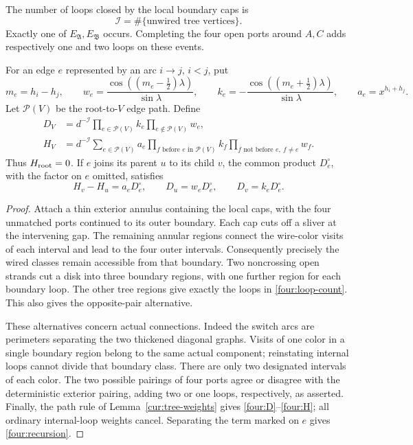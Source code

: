 \begin{lemma}
\label{four:tree}
The number of loops closed by the local boundary caps is
\begin{equation}
 \mathcal I=\#\{\text{unwired tree vertices}\}.
 \label{four:loop-count}
\end{equation}
Exactly one of $E_{\mathfrak A},E_{\mathfrak B}$ occurs.  Completing the
four open ports around $A,C$ adds respectively one and two loops on these
events.

For an edge $e$ represented by an arc $i\to j$, $i<j$, put
\begin{equation}
 m_e=h_i-h_j,\qquad
 w_e=\frac{\cos((m_e-\tfrac12)\lambda)}{\sin\lambda},\qquad
 k_e=-\frac{\cos((m_e+\tfrac12)\lambda)}{\sin\lambda},\qquad
 a_e=x^{h_i+h_j}.
 \label{four:edge-weights}
\end{equation}
Let $\mathcal P(V)$ be the root-to-$V$ edge path.  Define
\begin{align}
 D_V&=d^{-\mathcal I}\prod_{e\in\mathcal P(V)}k_e
                         \prod_{e\notin\mathcal P(V)}w_e,\label{four:D}\\
 H_V&=d^{-\mathcal I}\sum_{e\in\mathcal P(V)}a_e
       \prod_{f\text{ before }e\text{ in }\mathcal P(V)}k_f
       \prod_{f\text{ not before }e,\ f\ne e}w_f.
       \label{four:H}
\end{align}
Thus $H_{\rm root}=0$.  If $e$ joins its parent $u$ to its child $v$, the
common product $D_e^\circ$, with the factor on $e$ omitted, satisfies
\begin{equation}
 H_v-H_u=a_eD_e^\circ,\qquad
 D_u=w_eD_e^\circ,\qquad D_v=k_eD_e^\circ.
 \label{four:recursion}
\end{equation}
\end{lemma}

\begin{proof}
Attach a thin exterior annulus containing the local caps, with the four
unmatched ports continued to its outer boundary.  Each cap cuts off a
sliver at the intervening gap.  The remaining annular regions connect
the wire-color visits of each interval and lead to the four outer
intervals.  Consequently precisely the wired classes remain accessible
from that boundary.  Two noncrossing open strands cut a disk into three
boundary regions, with one further region for each boundary loop.  The
other tree regions give exactly the loops in \eqref{four:loop-count}.
This also gives the opposite-pair alternative.

These alternatives concern actual connections.  Indeed the switch arcs
are perimeters separating the two thickened diagonal graphs.  Visits of
one color in a single boundary region belong to the same actual component;
reinstating internal loops cannot divide that boundary class.  There
are only two designated intervals of each color.  The two possible
pairings of four ports agree or disagree with the deterministic exterior
pairing, adding two or one loops, respectively, as asserted.  Finally,
the path rule of Lemma~\ref{cur:tree-weights} gives
\eqref{four:D}--\eqref{four:H}; all ordinary internal-loop weights cancel.
Separating the term marked on $e$ gives \eqref{four:recursion}.
\end{proof}

